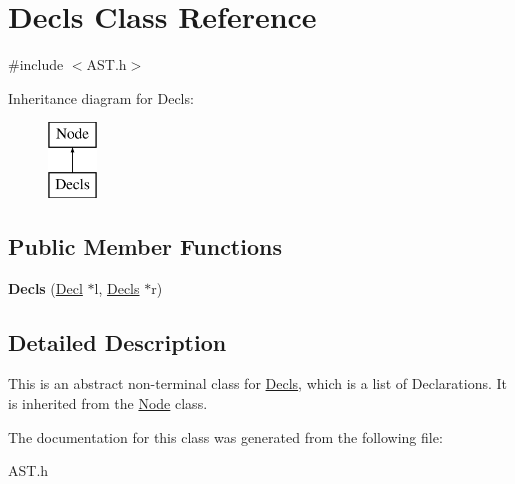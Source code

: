 \hypertarget{class_decls}{}\section{Decls Class Reference}
\label{class_decls}


{\ttfamily \#include $<$A\+S\+T.\+h$>$}

Inheritance diagram for Decls\+:\begin{figure}[H]
\begin{center}
\leavevmode
\includegraphics[height=2.000000cm]{class_decls}
\end{center}
\end{figure}
\subsection*{Public Member Functions}
\begin{DoxyCompactItemize}
\item 
\hypertarget{class_decls_acddfdb40dc97eb6937ec872c9037e2fb}{}{\bfseries Decls} (\hyperlink{class_decl}{Decl} $\ast$l, \hyperlink{class_decls}{Decls} $\ast$r)\label{class_decls_acddfdb40dc97eb6937ec872c9037e2fb}

\end{DoxyCompactItemize}


\subsection{Detailed Description}
This is an abstract non-\/terminal class for \hyperlink{class_decls}{Decls}, which is a list of Declarations. It is inherited from the \hyperlink{class_node}{Node} class. 

The documentation for this class was generated from the following file\+:\begin{DoxyCompactItemize}
\item 
A\+S\+T.\+h\end{DoxyCompactItemize}

